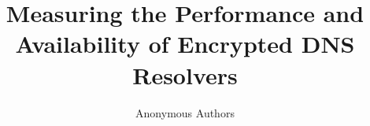 \documentclass[]{llncs}
\begin{document}
\title{Measuring the Performance and Availability of Encrypted DNS Resolvers}

\author{Anonymous Authors}


\maketitle

\begin{sloppypar}







\label{lastpage}

\pagebreak



\end{sloppypar}
\end{document}
